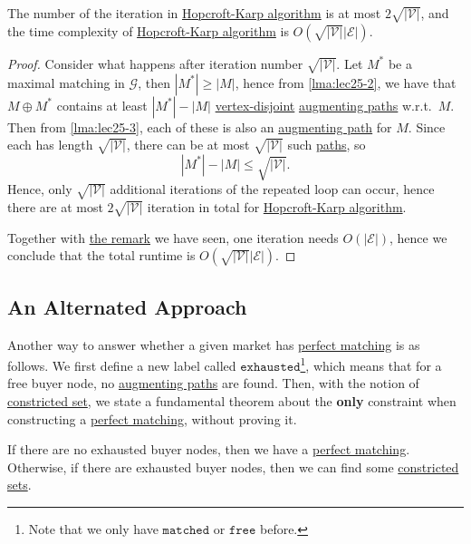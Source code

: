 \begin{theorem}
	The number of the iteration in \hyperref[algo:Hopcroft-Karp-algorithm]{Hopcroft-Karp algorithm} is at most \(2\sqrt{\left\vert \mathcal{V}  \right\vert } \), and the time complexity of \hyperref[algo:Hopcroft-Karp-algorithm]{Hopcroft-Karp algorithm} is \(O(\sqrt{\left\vert \mathcal{V}  \right\vert } \left\vert \mathcal{E}  \right\vert )\).
\end{theorem}
\begin{proof}
	Consider what happens after iteration number \(\sqrt{\left\vert \mathcal{V}  \right\vert } \). Let \(M^{\ast} \) be a maximal matching in \(\mathcal{G} \), then \(\left\vert M^{\ast}  \right\vert \geq \left\vert M \right\vert \), hence from \autoref{lma:lec25-2}, we have that \(M\oplus M^{\ast} \) contains at least \(\left\vert M^{\ast}  \right\vert - \left\vert M \right\vert \) \hyperref[def:vertex-independent]{vertex-disjoint} \hyperref[def:augmenting-path]{augmenting paths} w.r.t.\ \(M\). Then from \autoref{lma:lec25-3}, each of these is also an \hyperref[def:augmenting-path]{augmenting path} for \(M\). Since each has length \(\sqrt{\left\vert \mathcal{V}  \right\vert } \), there can be at most \(\sqrt{\left\vert \mathcal{V}  \right\vert } \) such \hyperref[def:path]{paths}, so
	\[
		\left\vert M^{\ast}  \right\vert - \left\vert M \right\vert \leq \sqrt{\left\vert \mathcal{V}  \right\vert } .
	\]
	Hence, only \(\sqrt{\left\vert \mathcal{V}  \right\vert } \) additional iterations of the repeated loop can occur, hence there are at most \(2 \sqrt{ \left\vert \mathcal{V}  \right\vert } \) iteration in total for \hyperref[algo:Hopcroft-Karp-algorithm]{Hopcroft-Karp algorithm}.

	Together with \hyperref[rmk:lec25-1]{the remark} we have seen, one iteration needs \(O(\left\vert \mathcal{E}  \right\vert )\), hence we conclude that the total runtime is \(O(\sqrt{\left\vert \mathcal{V}  \right\vert } \left\vert \mathcal{E}  \right\vert )\).
\end{proof}

\subsection{An Alternated Approach}
Another way to answer whether a given market has \hyperref[def:perfect-matching]{perfect matching} is as follows. We first define a new label called \(\mathtt{exhausted}\)\footnote{Note that we only have \(\mathtt{matched}\) or \(\mathtt{free}\) before.}, which means that for a free buyer node, no \hyperref[def:augmenting-path]{augmenting paths} are found. Then, with the notion of \hyperref[def:constricted-set]{constricted set}, we state a fundamental theorem about the \textbf{only} constraint when constructing a \hyperref[def:perfect-matching]{perfect matching}, without proving it.
\begin{theorem}\label{thm:lec25-2}
	If there are no exhausted buyer nodes, then we have a \hyperref[def:perfect-matching]{perfect matching}. Otherwise, if there are exhausted buyer nodes, then we can find some \hyperref[def:constricted-set]{constricted sets}.
\end{theorem}


